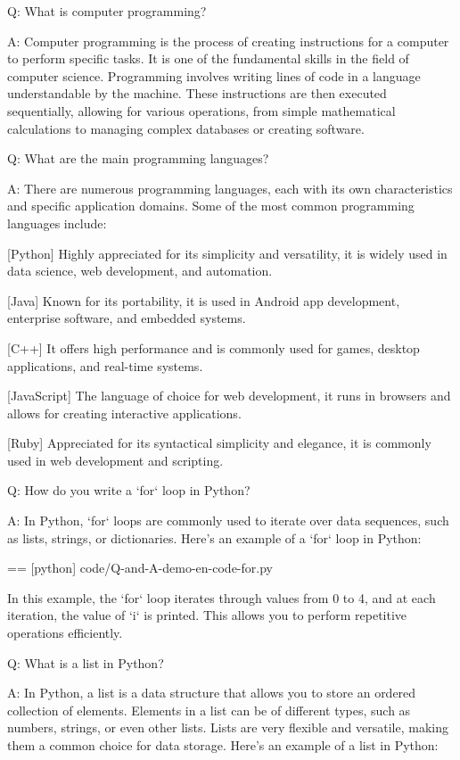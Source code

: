 
Q:
  What is computer programming?

A:
  Computer programming is the process of creating instructions for a computer to perform specific tasks. It is one of the fundamental skills in the field of computer science. Programming involves writing lines of code in a language understandable by the machine. These instructions are then executed sequentially, allowing for various operations, from simple mathematical calculations to managing complex databases or creating software.

Q:
  What are the main programming languages?

A:
  There are numerous programming languages, each with its own characteristics and specific application domains. Some of the most common programming languages include:

  [Python]
    Highly appreciated for its simplicity and versatility, it is widely used in data science, web development, and automation.

  [Java]
    Known for its portability, it is used in Android app development, enterprise software, and embedded systems.

  [C++]
    It offers high performance and is commonly used for games, desktop applications, and real-time systems.

  [JavaScript]
    The language of choice for web development, it runs in browsers and allows for creating interactive applications.

  [Ruby]
    Appreciated for its syntactical simplicity and elegance, it is commonly used in web development and scripting.

Q:
  How do you write a `for` loop in Python?

A:
  In Python, `for` loops are commonly used to iterate over data sequences, such as lists, strings, or dictionaries. Here's an example of a `for` loop in Python:

  == [python] {code/Q-and-A-demo-en-code-for.py}

  In this example, the `for` loop iterates through values from 0 to 4, and at each iteration, the value of `i` is printed. This allows you to perform repetitive operations efficiently.

Q:
  What is a list in Python?

A:
  In Python, a list is a data structure that allows you to store an ordered collection of elements. Elements in a list can be of different types, such as numbers, strings, or even other lists. Lists are very flexible and versatile, making them a common choice for data storage. Here's an example of a list in Python:

